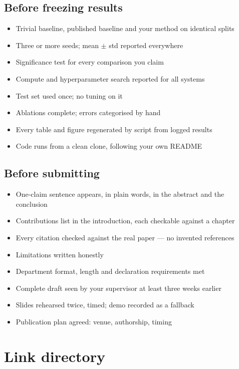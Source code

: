 \documentclass[11pt,a4paper]{article}
\begin{document}
\subsection*{Before freezing results}
\begin{itemize}
  \item Trivial baseline, published baseline and your method on identical
        splits
  \item Three or more seeds; mean $\pm$ std reported everywhere
  \item Significance test for every comparison you claim
  \item Compute and hyperparameter search reported for all systems
  \item Test set used once; no tuning on it
  \item Ablations complete; errors categorised by hand
  \item Every table and figure regenerated by script from logged results
  \item Code runs from a clean clone, following your own README
\end{itemize}

\subsection*{Before submitting}
\begin{itemize}
  \item One-claim sentence appears, in plain words, in the abstract and the
        conclusion
  \item Contributions list in the introduction, each checkable against a
        chapter
  \item Every citation checked against the real paper --- no invented
        references
  \item Limitations written honestly
  \item Department format, length and declaration requirements met
  \item Complete draft seen by your supervisor at least three weeks earlier
  \item Slides rehearsed twice, timed; demo recorded as a fallback
  \item Publication plan agreed: venue, authorship, timing
\end{itemize}

\appendix
\section{Link directory}
\end{document}
